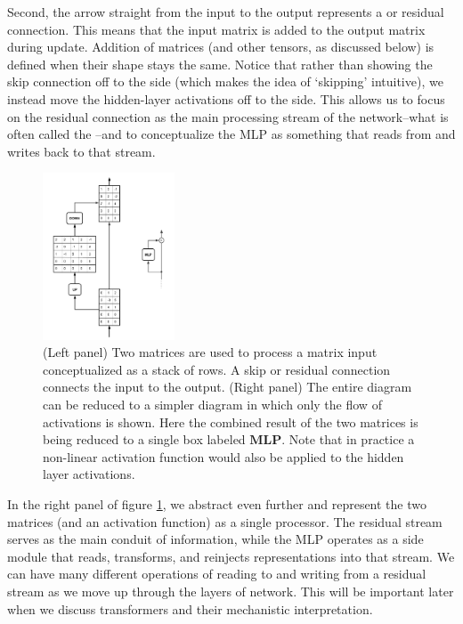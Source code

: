 Second, the arrow straight from the input to the output represents a  or residual connection. This means that the input matrix is added to the output matrix during update. Addition of matrices (and other tensors, as discussed below) is defined when their shape stays the same. Notice that rather than showing the skip connection off to the side (which makes the idea of ‘skipping’ intuitive), we instead move the hidden-layer activations off to the side. This allows us to focus on the residual connection as the main processing stream of the network--what is often called the --and to conceptualize the MLP as something that reads from and writes back to that stream. 

\begin{figure}[h]
\centering
\includegraphics[width=0.35\textwidth]{images/flowPerspective.png}
\caption[Jeff Yoshimi.]{(Left panel) Two matrices are used to process a matrix input conceptualized as a stack of rows. A skip or residual connection connects the input to the output. (Right panel) The entire diagram can be reduced to a simpler diagram in which only the flow of activations is shown. Here the combined result of the two matrices is being reduced to a single box labeled  $\mathbf{MLP}$. Note that in practice a non-linear activation function would also be applied to the hidden layer activations.}
\label{flowPerspective}
\end{figure} 

In the right panel of figure \ref{flowPerspective}, we abstract even further and represent the two matrices (and an activation function)  as a single processor. The residual stream serves as the main conduit of information, while the MLP operates as a side module that reads, transforms, and reinjects representations into that stream. We can have many different operations of reading to and writing from a residual stream as we move up through the layers of network. This will be important later when we discuss transformers and their mechanistic interpretation.

